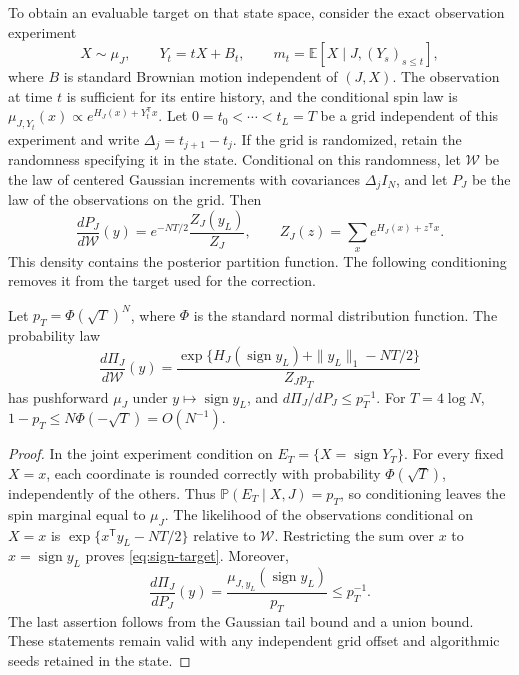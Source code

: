 \documentclass[11pt,reqno]{amsart}
\newcommand{\sign}{\operatorname{sign}}
\begin{document}
To obtain an evaluable target on that state space, consider the exact
observation experiment
\[
 X\sim\mu_J,\qquad Y_t=tX+B_t,
 \qquad m_t=\mathbb E[X\mid J,(Y_s)_{s\le t}],
\]
where $B$ is standard Brownian motion independent of $(J,X)$.
The observation at time $t$ is sufficient for its entire history, and
the conditional spin law is
$\mu_{J,Y_t}(x)\propto e^{H_J(x)+Y_t^{\mathsf T}x}$.
Let $0=t_0<\cdots<t_L=T$ be a grid independent of this experiment and
write $\Delta_j=t_{j+1}-t_j$. If the grid is randomized, retain the
randomness specifying it in the state. Conditional on this randomness,
let $\mathcal W$ be the law of centered Gaussian increments with
covariances $\Delta_j I_N$, and let $P_J$ be the law of the observations
on the grid. Then
\[
 \frac{dP_J}{d\mathcal W}(y)
 =e^{-NT/2}\frac{Z_J(y_L)}{Z_J},
 \qquad Z_J(z)=\sum_xe^{H_J(x)+z^{\mathsf T}x}.
\]
This density contains the posterior partition function. The following
conditioning removes it from the target used for the correction.

\begin{thm}
\label{thm:sign-target}
Let $p_T=\Phi(\sqrt T)^N$, where $\Phi$ is the standard normal
distribution function. The probability law
\begin{equation}\label{eq:sign-target}
 \frac{d\Pi_J}{d\mathcal W}(y)
 =\frac{\exp\{H_J(\sign y_L)+\|y_L\|_1-NT/2\}}{Z_Jp_T}
\end{equation}
has pushforward $\mu_J$ under $y\mapsto\sign y_L$, and
$d\Pi_J/dP_J\le p_T^{-1}$. For $T=4\log N$,
$1-p_T\le N\Phi(-\sqrt T)=O(N^{-1})$.
\end{thm}
\begin{proof}
In the joint experiment condition on
$E_T=\{X=\sign Y_T\}$. For every fixed $X=x$, each coordinate is
rounded correctly with probability $\Phi(\sqrt T)$, independently of
the others. Thus $\mathbb P(E_T\mid X,J)=p_T$, so conditioning leaves
the spin marginal equal to $\mu_J$. The likelihood of the observations
conditional on $X=x$ is
$\exp\{x^{\mathsf T}y_L-NT/2\}$ relative to $\mathcal W$.
Restricting the sum over $x$ to $x=\sign y_L$ proves
\eqref{eq:sign-target}. Moreover,
\[
 \frac{d\Pi_J}{dP_J}(y)
   =\frac{\mu_{J,y_L}(\sign y_L)}{p_T}\le p_T^{-1}.
\]
The last assertion follows from the Gaussian tail bound and a union
bound. These statements remain valid with any independent grid offset
and algorithmic seeds retained in the state.
\end{proof}
\end{document}
